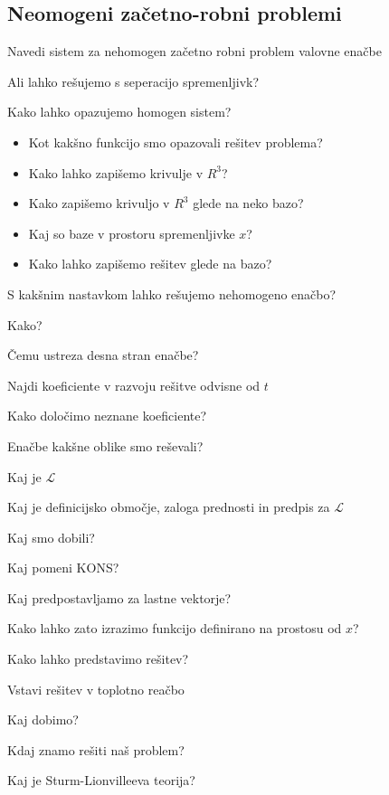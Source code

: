 \documentclass{article}
\begin{document}
    \subsection{Neomogeni začetno-robni problemi}
    \begin{enumerate}
        \item Navedi sistem za nehomogen začetno robni problem valovne enačbe
        \item Ali lahko rešujemo s seperacijo spremenljivk?
        \item Kako lahko opazujemo homogen sistem?
        {\color{red}\begin{itemize}
            \item Kot kakšno funkcijo smo opazovali rešitev problema?
            \item Kako lahko zapišemo krivulje v $R^3$?
            \item Kako zapišemo krivuljo v $R^3$ glede na neko bazo?
            \item Kaj so baze v prostoru spremenljivke $x$?
            \item Kako lahko zapišemo rešitev glede na bazo?
        \end{itemize}}
        {\color{red}\item S kakšnim nastavkom lahko rešujemo nehomogeno enačbo?}
        \item Kako?
        {\color{red}\item Čemu ustreza desna stran enačbe?}
        \item Najdi koeficiente v razvoju rešitve odvisne od $t$
        {\color{red}\item Kako določimo neznane koeficiente?}
        {\color{red}\item Enačbe kakšne oblike smo reševali?}
        \item Kaj je $\mathcal{L}$
        {\color{red}\item Kaj je definicijsko območje, zaloga prednosti in predpis za $\mathcal{L}$}
        {\color{red}\item Kaj smo dobili?}
        \item Kaj pomeni KONS?
        {\color{red}\item Kaj predpostavljamo za lastne vektorje?}
        {\color{red}\item Kako lahko zato izrazimo funkcijo definirano na prostosu od $x$?}
        \item Kako lahko predstavimo rešitev?
        \item Vstavi rešitev v toplotno reačbo
        \item Kaj dobimo?
        {\color{red}\item Kdaj znamo rešiti naš problem?}
        {\color{red}\item Kaj je Sturm-Lionvilleeva teorija?}
    \end{enumerate}
\end{document}
